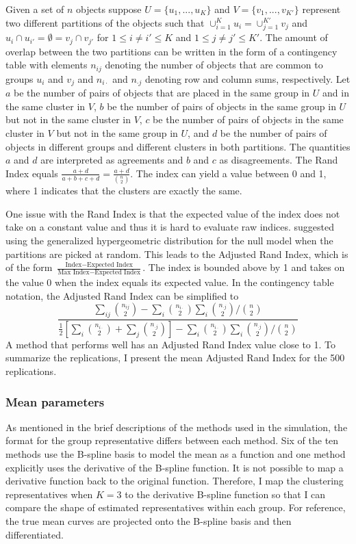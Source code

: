 Given a set of $n$ objects suppose $U = \{u_{1},...,u_{K}\}$ and $V=\{v_{1},...,v_{K'}\}$ represent two different partitions of the objects such that $\cup^{K}_{i=1}u_{i}  = \cup^{K'}_{j=1}v_{j}$ and $u_{i}\cap u_{i'} = \emptyset = v_{j}\cap v_{j'}$ for $1\leq i\not=i'\leq K$ and $1\leq j\not= j'\leq K'$. The amount of overlap between the two partitions can be written in the form of a contingency table with elements $n_{ij}$ denoting the number of objects that are common to groups $u_{i}$ and $v_{j}$ and $n_{i\cdot}$ and $n_{\cdot j}$ denoting row and column sums, respectively. Let $a$ be the number of pairs of objects that are placed in the same group in $U$ and in the same cluster in $V$, $b$ be the number of pairs of objects in the same group in $U$ but not in the same cluster in $V$, $c$ be the number of pairs of objects in the same cluster in $V$ but not in the same group in $U$, and $d$ be the number of pairs of objects in different groups and different clusters in both partitions. The quantities $a$ and $d$ are interpreted as agreements and $b$ and $c$ as disagreements. The Rand Index \cite{rand1971} equals $\frac{a+d}{a+b+c+d}=\frac{a+d}{{n \choose 2}}$.  The index can yield a value between 0 and 1, where 1 indicates that the clusters are exactly the same.

One issue with the Rand Index is that the expected value of the index does not take on a constant value and thus it is hard to evaluate raw indices. \Textcite{hubert1985} suggested using the generalized hypergeometric distribution for the null model when the partitions are picked at random. This leads to the Adjusted Rand Index, which is of the form $\frac{\text{Index} - \text{Expected Index}}{\text{Max Index}-\text{Expected Index}}$. The index is bounded above by 1 and takes on the value 0 when the index equals its expected value. In the contingency table notation, the Adjusted Rand Index can be simplified to
$$\frac{\sum_{ij}{n_{ij} \choose 2} - \sum_{i} {n_{i\cdot} \choose 2} \sum_{i} {n_{\cdot j} \choose 2} / {n \choose 2}}{\frac{1}{2}\left[\sum_{i}{n_{i\cdot} \choose 2}+\sum_{j}{n_{\cdot j} \choose 2}\right] - \sum_{i} {n_{i\cdot} \choose 2} \sum_{i} {n_{\cdot j} \choose 2} / {n \choose 2}}$$
A method that performs well has an Adjusted Rand Index value close to 1. To summarize the replications, I present the mean Adjusted Rand Index for the 500 replications.

\subsubsection{Mean parameters}
As mentioned in the brief descriptions of the methods used in the simulation, the format for the group representative differs between each method. Six of the ten methods use the B-spline basis to model the mean as a function and one method explicitly uses the derivative of the B-spline function. It is not possible to map a derivative function back to the original function. Therefore, I map the clustering representatives when $K=3$ to the derivative B-spline function so that I can compare the shape of estimated representatives within each group. For reference, the true mean curves are projected onto the B-spline basis and then differentiated. 

